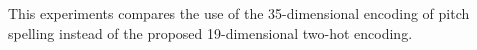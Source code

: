 
This experiments compares the use of the 35-dimensional
encoding of pitch spelling instead of the proposed
19-dimensional two-hot encoding.

